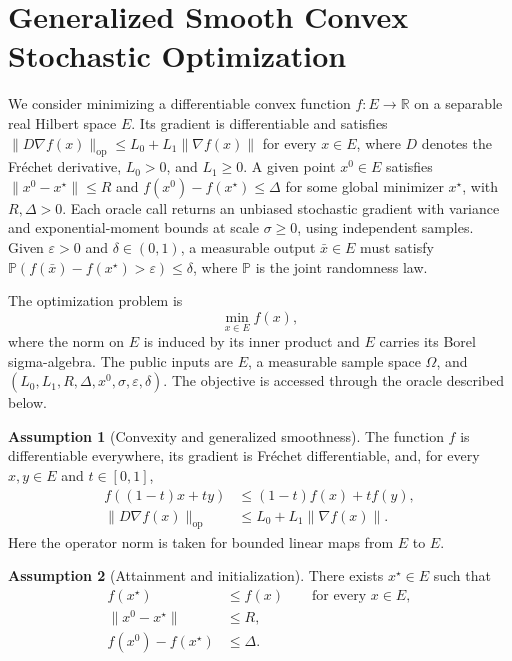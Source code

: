 \documentclass[10pt]{article}
\theoremstyle{definition}
\newtheorem{assumption}{Assumption}
\begin{document}
\section*{Generalized Smooth Convex Stochastic Optimization}
We consider minimizing a differentiable convex function $f:E\to\mathbb{R}$ on a separable real Hilbert space $E$. Its gradient is differentiable and satisfies $\|D\nabla f(x)\|_{\mathrm{op}}\leq L_0+L_1\|\nabla f(x)\|$ for every $x\in E$, where $D$ denotes the Fr\'echet derivative, $L_0>0$, and $L_1\geq0$. A given point $x^0\in E$ satisfies $\|x^0-x^\star\|\leq R$ and $f(x^0)-f(x^\star)\leq\Delta$ for some global minimizer $x^\star$, with $R,\Delta>0$. Each oracle call returns an unbiased stochastic gradient with variance and exponential-moment bounds at scale $\sigma\geq0$, using independent samples. Given $\varepsilon>0$ and $\delta\in(0,1)$, a measurable output $\bar{x}\in E$ must satisfy $\mathbb{P}(f(\bar{x})-f(x^\star)>\varepsilon)\leq\delta$, where $\mathbb{P}$ is the joint randomness law.

The optimization problem is
\[
\min_{x\in E} f(x),
\]
where the norm on $E$ is induced by its inner product and $E$ carries its Borel sigma-algebra. The public inputs are $E$, a measurable sample space $\Omega$, and $(L_0,L_1,R,\Delta,x^0,\sigma,\varepsilon,\delta)$. The objective is accessed through the oracle described below.

\begin{assumption}[Convexity and generalized smoothness]
The function $f$ is differentiable everywhere, its gradient is Fr\'echet differentiable, and, for every $x,y\in E$ and $t\in[0,1]$,
\begin{align*}
f((1-t)x+ty) &\leq (1-t)f(x)+tf(y),\\
\|D\nabla f(x)\|_{\mathrm{op}} &\leq L_0+L_1\|\nabla f(x)\|.
\end{align*}
Here the operator norm is taken for bounded linear maps from $E$ to $E$.
\end{assumption}

\begin{assumption}[Attainment and initialization]
There exists $x^\star\in E$ such that
\begin{align*}
f(x^\star) &\leq f(x) \qquad \text{for every }x\in E,\\
\|x^0-x^\star\| &\leq R,\\
f(x^0)-f(x^\star) &\leq\Delta.
\end{align*}
\end{assumption}
\end{document}
